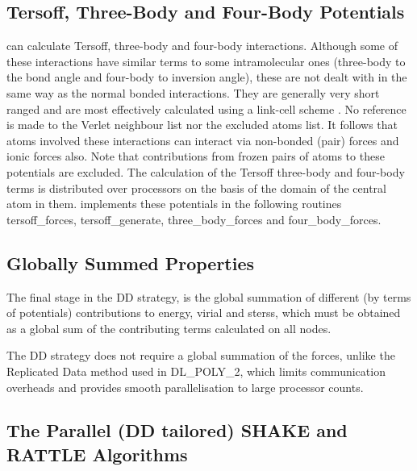 \subsection{Tersoff, Three-Body and Four-Body Potentials}

\D can calculate Tersoff, three-body and four-body interactions.
Although some of these interactions have similar terms to some
intramolecular ones (three-body to the bond angle and four-body to
inversion angle), these are not dealt with in the same way as the
normal bonded interactions.  They are
generally very short ranged and are most effectively calculated
using a link-cell scheme \cite{hockney-81a}.  No reference is made
to the Verlet neighbour list nor the
excluded atoms list.  It follows that atoms involved these
interactions can interact via non-bonded (pair) forces and ionic
forces also.  Note that contributions from frozen pairs of atoms
to these potentials are excluded.  The calculation of the Tersoff
three-body and four-body terms is distributed over
processors on the basis of the domain of the central atom in them.
\D implements these potentials in the following routines
{\sc tersoff\_forces}, {\sc tersoff\_generate},
{\sc three\_body\_forces} and {\sc four\_body\_forces}.

\subsection{Globally Summed Properties}

The final stage in the DD strategy, is the global summation of
different (by terms of potentials) contributions to energy, virial
and sterss, which must be obtained as a global sum of the
contributing terms calculated on all nodes.

The DD strategy does not require a global summation of the forces,
unlike the Replicated Data method used in DL\_POLY\_2, which
limits communication overheads and provides smooth parallelisation
to large processor counts.

\subsection{The Parallel (DD tailored) SHAKE and RATTLE Algorithms}

